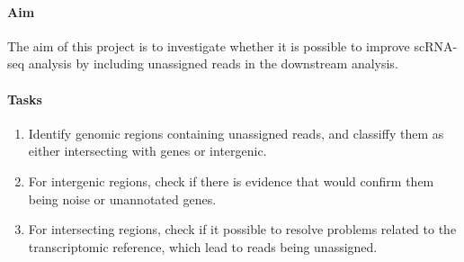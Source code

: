 \paragraph{\textbf{Aim}}

The aim of this project is to investigate whether it is possible to improve scRNA-seq analysis
by including unassigned reads in the downstream analysis.

\paragraph{\textbf{Tasks}}

\begin{enumerate}
  \item Identify genomic regions containing unassigned reads, and classiffy them as either intersecting with genes or intergenic.
  \item For intergenic regions, check if there is evidence that would confirm them being noise or unannotated genes.
  \item For intersecting regions, check if it possible to resolve problems related to the transcriptomic reference,
  which lead to reads being unassigned.
\end{enumerate}
